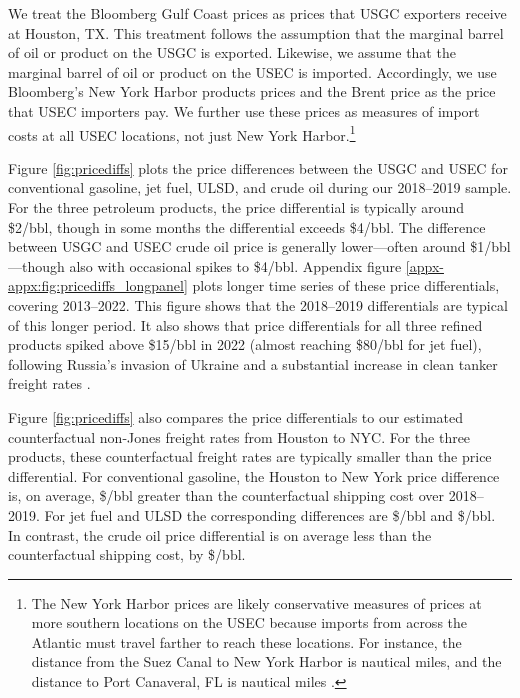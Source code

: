 \documentclass[12pt]{article}
\begin{document}
We treat the Bloomberg Gulf Coast prices as prices that USGC exporters receive at Houston, TX. This treatment follows the assumption that the marginal barrel of oil or product on the USGC is exported. Likewise, we assume that the marginal barrel of oil or product on the USEC is imported. Accordingly, we use Bloomberg's New York Harbor products prices and the Brent price as the price that USEC importers pay. We further use these prices as measures of import costs at all USEC locations, not just New York Harbor.\footnote{The New York Harbor prices are likely conservative measures of prices at more southern locations on the USEC because imports from across the Atlantic must travel farther to reach these locations. For instance, the distance from the Suez Canal to New York Harbor is nautical miles, and the distance to Port Canaveral, FL is nautical miles \citep{Searoutes2023}.}

Figure \ref{fig:pricediffs} plots the price differences between the USGC and USEC for conventional gasoline, jet fuel, ULSD, and crude oil during our 2018--2019 sample. For the three petroleum products, the price differential is typically around \$2/bbl, though in some months the differential exceeds \$4/bbl. The difference between USGC and USEC crude oil price is generally lower---often around \$1/bbl---though also with occasional spikes to \$4/bbl. Appendix figure \ref{appx-appx:fig:pricediffs_longpanel} plots longer time series of these price differentials, covering 2013--2022. This figure shows that the 2018--2019 differentials are typical of this longer period. It also shows that price differentials for all three refined products spiked above \$15/bbl in 2022 (almost reaching \$80/bbl for jet fuel), following Russia's invasion of Ukraine and a substantial increase in clean tanker freight rates \citep{EIAtankers2022}.

Figure \ref{fig:pricediffs} also compares the price differentials to our estimated counterfactual non-Jones freight rates from Houston to NYC. For the three products, these counterfactual freight rates are typically smaller than the price differential. For conventional gasoline, the Houston to New York price difference is, on average, \$\unskip/bbl greater than the counterfactual shipping cost over 2018--2019. For jet fuel and ULSD the corresponding differences are \$\unskip/bbl and  \$\unskip/bbl. In contrast, the crude oil price differential is on average less than the counterfactual shipping cost, by \$\unskip/bbl.
\end{document}
